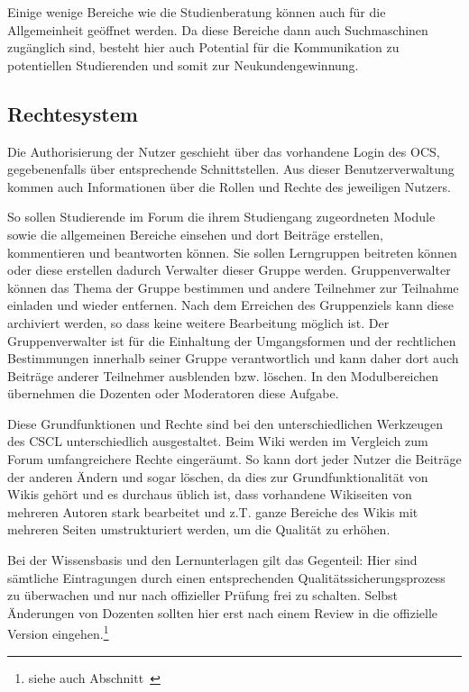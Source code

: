 Einige wenige Bereiche wie die Studienberatung können auch für die Allgemeinheit geöffnet werden. Da diese Bereiche dann auch Suchmaschinen zugänglich sind, besteht hier auch Potential für die Kommunikation zu potentiellen Studierenden und somit zur Neukundengewinnung.

\subsection{Rechtesystem} %
\label{sub:rechtesystem}
Die Authorisierung der Nutzer geschieht über das vorhandene Login des \ac{OCS}, gegebenenfalls über entsprechende Schnittstellen. Aus dieser Benutzerverwaltung kommen auch Informationen über die Rollen und Rechte des jeweiligen Nutzers. 

So sollen Studierende im Forum die ihrem Studiengang zugeordneten Module sowie die allgemeinen Bereiche einsehen und dort Beiträge erstellen, kommentieren und beantworten können. Sie sollen Lerngruppen beitreten können oder diese erstellen dadurch Verwalter dieser Gruppe werden. Gruppenverwalter können das Thema der Gruppe bestimmen und andere Teilnehmer zur Teilnahme einladen und wieder entfernen. Nach dem Erreichen des Gruppenziels kann diese archiviert werden, so dass keine weitere Bearbeitung möglich ist. Der Gruppenverwalter ist für die Einhaltung der Umgangsformen und der rechtlichen Bestimmungen innerhalb seiner Gruppe verantwortlich und kann daher dort auch Beiträge anderer Teilnehmer ausblenden bzw. löschen. In den Modulbereichen übernehmen die Dozenten oder Moderatoren diese Aufgabe.

Diese Grundfunktionen und Rechte sind bei den unterschiedlichen Werkzeugen des \ac{CSCL} unterschiedlich ausgestaltet. Beim Wiki werden im Vergleich zum Forum umfangreichere Rechte eingeräumt. So kann dort jeder Nutzer die Beiträge der anderen Ändern und sogar löschen, da dies zur Grundfunktionalität von Wikis gehört und es durchaus üblich ist, dass vorhandene Wikiseiten von mehreren Autoren stark bearbeitet und z.T. ganze Bereiche des Wikis mit mehreren Seiten umstrukturiert werden, um die Qualität zu erhöhen. 

Bei der Wissensbasis und den Lernunterlagen gilt das Gegenteil: Hier sind sämtliche Eintragungen durch einen entsprechenden Qualitätssicherungsprozess zu überwachen und nur nach offizieller Prüfung frei zu schalten. Selbst Änderungen von Dozenten sollten hier erst nach einem Review in die offizielle Version eingehen.\footnote{siehe auch Abschnitt~}

